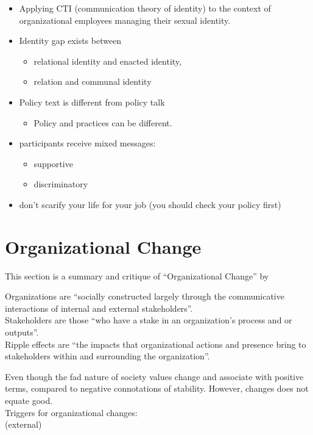 \documentclass[
]{book}
\providecommand{\tightlist}{%
  \setlength{\itemsep}{0pt}\setlength{\parskip}{0pt}}
\begin{document}
\begin{itemize}
\item
  Applying CTI (communication theory of identity) to the context of organizational employees managing their sexual
  identity.
\item
  Identity gap exists between

  \begin{itemize}
  \item
    relational identity and enacted identity,
  \item
    relation and communal identity
  \end{itemize}
\item
  Policy text is different from policy talk

  \begin{itemize}
  \tightlist
  \item
    Policy and practices can be different.
  \end{itemize}
\item
  participants receive mixed messages:

  \begin{itemize}
  \item
    supportive
  \item
    discriminatory
  \end{itemize}
\item
  don't scarify your life for your job (you should check your policy first)
\end{itemize}

\hypertarget{organizational-change}{%
\chapter{Organizational Change}\label{organizational-change}}

This section is a summary and critique of ``Organizational Change'' by \citep{Lewis_2019}

Organizations are ``socially constructed largely through the communicative interactions of internal and external
stakeholders''.\\
Stakeholders are those ``who have a stake in an organization's process and or outputs''.\\
Ripple effects are ``the impacts that organizational actions and presence bring to stakeholders within and surrounding
the organization''.

Even though the fad nature of society values change and associate with positive terms, compared to negative connotations
of stability. However, changes does not equate good.\\
Triggers for organizational changes:\\
(external)
\end{document}
